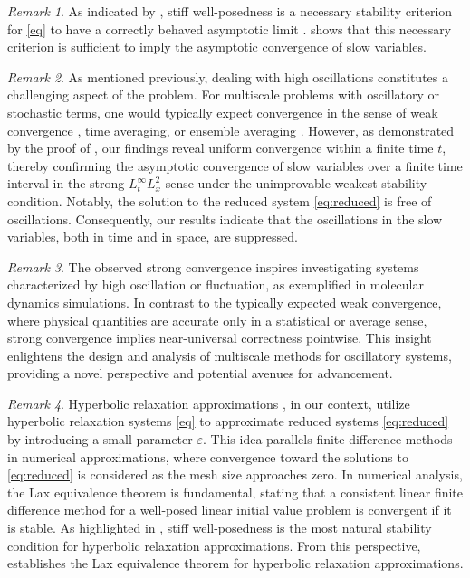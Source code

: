\documentclass{article}
\theoremstyle{plain}%
\theoremstyle{definition}%
\theoremstyle{remark}%
\newtheorem{remark}{Remark}%
\newcommand{\+}[1]{{\bm{#1}}}
\newcommand{\eps}{\varepsilon}
\begin{document}
\begin{remark}
  As indicated by , stiff well-posedness is 
  a necessary stability criterion for \cref{eq} to have a correctly 
  behaved asymptotic limit \cite{Yong_basic_2002}.
   shows that this necessary criterion is sufficient to 
  imply the asymptotic convergence of slow variables.
\end{remark}

\begin{remark}
  As mentioned previously, dealing with high oscillations constitutes 
  a challenging aspect of the problem. 
  For multiscale problems with oscillatory or stochastic terms, one 
  would typically expect convergence in the sense of weak 
  convergence \cite{Fanelli2019Asymtptocs}, time averaging, or 
  ensemble averaging \cite{Pavliotis2008Multiscale}. 
  However, as demonstrated by the proof of , our findings 
  reveal uniform convergence within a finite time $t$, thereby 
  confirming the asymptotic convergence of slow variables over a 
  finite time interval in the strong $L^\infty_t L^2_x$ sense under 
  the unimprovable weakest stability condition. 
  Notably, the solution to the reduced system 
  \eqref{eq:reduced} is free of oscillations. 
  Consequently, our results indicate that the oscillations in the 
  slow variables, both in time and in space, are suppressed.
\end{remark}

\begin{remark}
  The observed strong convergence inspires investigating  
  systems characterized by high oscillation or fluctuation, as 
  exemplified in molecular dynamics simulations. 
  In contrast to the typically expected weak convergence, where 
  physical quantities are accurate only in a statistical or average 
  sense, strong convergence implies near-universal correctness 
  pointwise. 
  This insight enlightens the design and analysis of multiscale 
  methods for oscillatory systems, providing a novel perspective and 
  potential avenues for advancement.
\end{remark}

\begin{remark}
  Hyperbolic relaxation approximations 
  \cite{JinXin1995relaxation,Natalini1996Convergence}, in our 
  context, utilize hyperbolic relaxation systems \eqref{eq} 
  to approximate reduced systems \eqref{eq:reduced} by introducing a 
  small parameter $\eps$.
  This idea parallels finite difference methods in numerical 
  approximations, where convergence toward the solutions to 
  \cref{eq:reduced} is considered as the mesh size approaches 
  zero. In numerical analysis, the Lax equivalence theorem 
  \cite{Lax1956Survey} is fundamental, stating that a consistent 
  linear finite difference method for a well-posed linear initial 
  value problem is convergent if it is stable.
  As highlighted in , stiff well-posedness is the 
  most natural stability condition for hyperbolic relaxation 
  approximations. 
  From this perspective,  establishes the Lax equivalence 
  theorem for hyperbolic relaxation approximations.
\end{remark}
\end{document}
